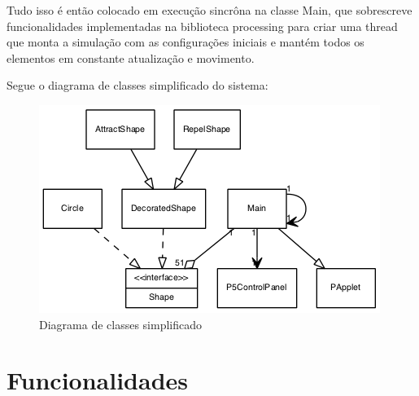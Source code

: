 \documentclass[12pt]{article}
\begin{document}
Tudo isso é então colocado em execução sincrôna na classe Main, que sobrescreve funcionalidades implementadas na biblioteca processing para criar uma thread
que monta a simulação com as configurações iniciais e mantém todos os elementos em constante atualização e movimento.

Segue o diagrama de classes simplificado do sistema:

\begin{figure}[h!]
	\centering
	\includegraphics[width=.8\textwidth]{uml_simple.png}
	\caption{Diagrama de classes simplificado}
	\label{uml}
\end{figure}

\vspace{0.8 true cm}

\section{Funcionalidades}
\label{funcionalidades}
\end{document}
